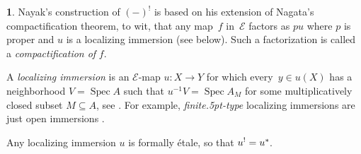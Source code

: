 \documentclass{compositio}
\theoremstyle{plain}
\theoremstyle{definition}
\newtheorem{cosa}[thm]{}
\theoremstyle{remark}
\numberwithin{equation}{thm}
\begin{document}
\begin{cosa}
\label{locimm}
Nayak's construction of $(-)^!$ is based on his extension \cite[p.\,536, Thm.\,4.1]{Nk}
of Nagata's compactification theorem, to wit, that any map~$f$ in~${\mathscr{E}}$ factors as
$pu$ where $p$ is proper  and $u$ is a localizing immersion (see below).  Such a factorization is called a \emph{compactification of} $f$.{\vspace{2pt}}

A \emph{localizing immersion} is an ${\mathscr{E}}$-map $u\colon X\to Y$  for which 
every~\mbox{$y\in u(X)$} has a neighborhood 
$V=\operatorname{Spec} A$ such that $u^{-1}V=\operatorname{Spec} A_M$ for some multiplicatively closed subset $M\subseteq A$, see \cite[p.\,532, 2.8.8]{Nk}. For example, \emph{finite{\kern.5pt}-type} localizing immersions are{\vspace{1pt}} just open immersions \cite[p.\,531, 2.8.3]{Nk}.

Any localizing immersion $u$ is formally \'etale, so that $u^!=u^*{\mkern-1mu}$.{\vspace{1pt}}
\end{cosa}
\end{document}
